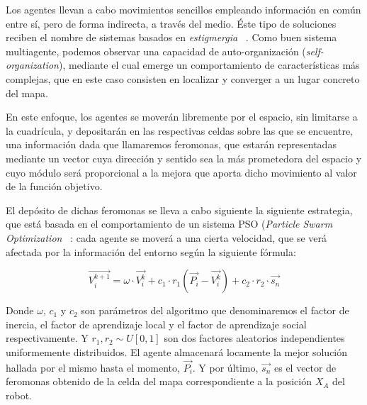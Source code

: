 \documentclass[runningheads]{llncs}
\begin{document}
    Los agentes llevan a cabo movimientos sencillos empleando información en común entre sí, pero de forma indirecta, a través del medio. Éste tipo de soluciones reciben el nombre de sistemas basados en \textit{estigmergia} ~\cite{stigmergy}.
    Como buen sistema multiagente, podemos observar una capacidad de auto-organización (\textit{self-organization}), mediante el cual emerge un comportamiento de características más complejas, que en este caso consisten en localizar y converger a un lugar concreto del mapa.

    En este enfoque, los agentes se moverán libremente por el espacio, sin limitarse a la cuadrícula, y depositarán en las respectivas celdas sobre las que se encuentre, una información dada que llamaremos feromonas, que estarán representadas mediante un vector cuya dirección y sentido sea la más prometedora del espacio y cuyo módulo será proporcional a la mejora que aporta dicho movimiento al valor de la función objetivo.

    El depósito de dichas feromonas se lleva a cabo siguiente la siguiente estrategia, que está basada en el comportamiento de un sistema PSO (\textit{Particle Swarm Optimization} ~\cite{PSO}: cada agente se moverá a una cierta velocidad, que se verá afectada por la información del entorno según la siguiente fórmula:


    \[
        \vec{V_i^{k+1}} = \omega \cdot \vec{V_i^k} + c_1 \cdot r_1(\vec{P_i} - \vec{V_i^k}) + c_2 \cdot r_2 \cdot \vec{s_n}
    \]

    Donde $\omega$, $c_1$ y $c_2$ son parámetros del algoritmo que denominaremos el factor de inercia, el factor de aprendizaje local y el factor de aprendizaje social respectivamente. Y $r_1, r_2 \sim U[0,1]$ son dos factores aleatorios independientes uniformemente distribuidos.
    El agente almacenará locamente la mejor solución hallada por el mismo hasta el momento, $\vec{P_i}$.
    Y por último, $\vec{s_n}$ es el vector de feromonas obtenido de la celda del mapa correspondiente a la posición $X_A$ del robot.
\end{document}
